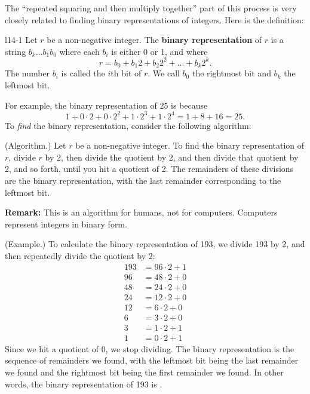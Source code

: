 \documentclass[letterpaper]{article}
\begin{document}
The ``repeated squaring and then multiply together'' part of this process is very closely related to finding binary representations of integers. Here is the definition: 
\begin{definition}{}{l14-1}
    Let $r$ be a non-negative integer. The \textbf{binary representation} of $r$ is a string $b_{k} \hdots b_{1}b_{0}$ where each $b_i$ is either 0 or 1, and where 
    \[r = b_0 + b_1 2 + b_2 2^2 + \hdots + b_k 2^k.\]
    The number $b_i$ is called the $i$th bit of $r$. We call $b_0$ the rightmost bit and $b_k$ the leftmost bit. 
\end{definition}
For example, the binary representation of 25 is  because \[1 + 0 \cdot 2 + 0 \cdot 2^2 + 1 \cdot 2^3 + 1 \cdot 2^4 = 1 + 8 + 16 = 25.\] To \emph{find} the binary representation, consider the following algorithm: 
\begin{mdframed}
    (Algorithm.) Let $r$ be a non-negative integer. To find the binary representation of $r$, divide $r$ by 2, then divide the quotient by 2, and then divide that quotient by 2, and so forth, until you hit a quotient of 2. The remainders of these divisions are the binary representation, with the last remainder corresponding to the leftmost bit. 
\end{mdframed}
\textbf{Remark:} This is an algorithm for humans, not for computers. Computers represent integers in binary form. 

\begin{mdframed}
    (Example.) To calculate the binary representation of 193, we divide 193 by 2, and then repeatedly divide the quotient by 2: 
    \begin{equation*}
        \begin{aligned}
            193 &= 96 \cdot 2 + 1 \\ 
            96 &= 48 \cdot 2 + 0 \\ 
            48 &= 24 \cdot 2 + 0 \\ 
            24 &= 12 \cdot 2 + 0 \\ 
            12 &= 6 \cdot 2 + 0 \\ 
            6 &= 3 \cdot 2 + 0 \\ 
            3 &= 1 \cdot 2 + 1 \\ 
            1 &= 0 \cdot 2 + 1
        \end{aligned}
    \end{equation*}
    Since we hit a quotient of 0, we stop dividing. The binary representation is the sequence of remainders we found, with the leftmost bit being the last remainder we found and the rightmost bit being the first remainder we found. In other words, the binary representation of 193 is .
\end{mdframed}
\end{document}
